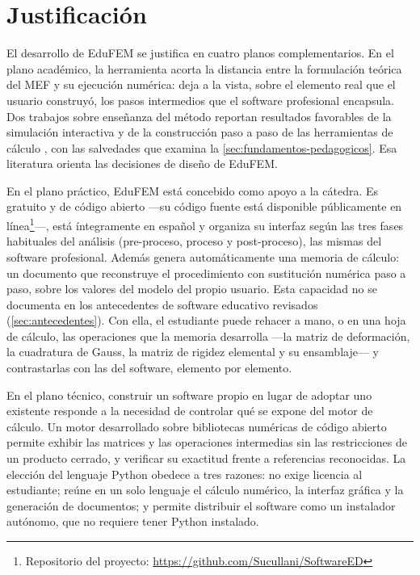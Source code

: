 \section*{Justificación}

El desarrollo de EduFEM se justifica en cuatro planos complementarios. En el plano académico, la herramienta acorta la distancia entre la formulación teórica del MEF y su ejecución numérica: deja a la vista, sobre el elemento real que el usuario construyó, los pasos intermedios que el software profesional encapsula. Dos trabajos sobre enseñanza del método reportan resultados favorables de la simulación interactiva y de la construcción paso a paso de las herramientas de cálculo \autocites[p.~168]{lee2015interactive}[p.~1023]{bishay2020teaching}, con las salvedades que examina la \autoref{sec:fundamentos-pedagogicos}. Esa literatura orienta las decisiones de diseño de EduFEM.

En el plano práctico, EduFEM está concebido como apoyo a la cátedra. Es gratuito y de código abierto —su código fuente está disponible públicamente en línea\footnote{Repositorio del proyecto: \url{https://github.com/Sucullani/SoftwareED}}—, está íntegramente en español y organiza su interfaz según las tres fases habituales del análisis (pre-proceso, proceso y post-proceso), las mismas del software profesional. Además genera automáticamente una memoria de cálculo: un documento que reconstruye el procedimiento con sustitución numérica paso a paso, sobre los valores del modelo del propio usuario. Esta capacidad no se documenta en los antecedentes de software educativo revisados (\autoref{sec:antecedentes}). Con ella, el estudiante puede rehacer a mano, o en una hoja de cálculo, las operaciones que la memoria desarrolla —la matriz de deformación, la cuadratura de Gauss, la matriz de rigidez elemental y su ensamblaje— y contrastarlas con las del software, elemento por elemento.

En el plano técnico, construir un software propio en lugar de adoptar uno existente responde a la necesidad de controlar qué se expone del motor de cálculo. Un motor desarrollado sobre bibliotecas numéricas de código abierto \autocite{harris2020numpy,virtanen2020scipy} permite exhibir las matrices y las operaciones intermedias sin las restricciones de un producto cerrado, y verificar su exactitud frente a referencias reconocidas. La elección del lenguaje Python obedece a tres razones: no exige licencia al estudiante; reúne en un solo lenguaje el cálculo numérico, la interfaz gráfica y la generación de documentos; y permite distribuir el software como un instalador autónomo, que no requiere tener Python instalado.

